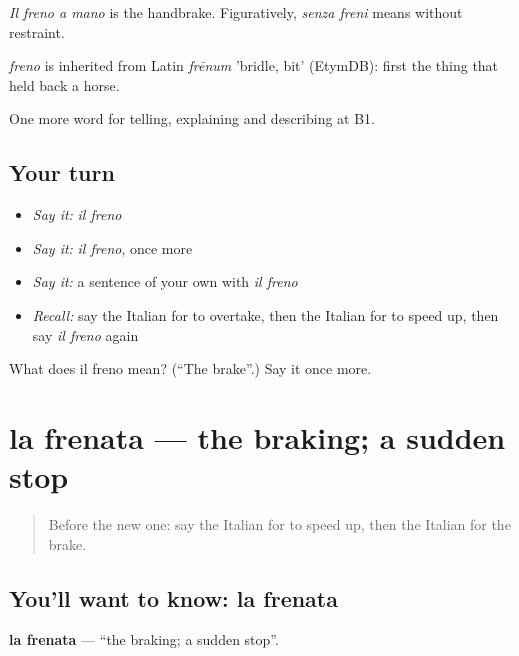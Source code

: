 \emph{Il freno a mano} is the handbrake. Figuratively, \emph{senza freni} means without restraint.

\begin{cousinweb}
\emph{freno} is inherited from Latin \emph{frēnum} 'bridle, bit' (EtymDB): first the thing that held back a horse.
\end{cousinweb}

\begin{grammarlens}[title={What you've built}]
One more word for telling, explaining and describing at B1.
\end{grammarlens}

\subsection*{Your turn}
\begin{itemize}
\raggedright
  \item \emph{Say it:} \emph{il freno}
  \item \emph{Say it:} \emph{il freno}, once more
  \item \emph{Say it:} a sentence of your own with \emph{il freno}
  \item \emph{Recall:} say the Italian for to overtake, then the Italian for to speed up, then say \emph{il freno} again
\end{itemize}

\begin{tcolorbox}[breakable,colback=teal!4,colframe=teal!35!black,title={Before you move on}]
What does il freno mean? (\textquotedblleft{}The brake\textquotedblright{}.) Say it once more.
\end{tcolorbox}
\section[la frenata]{la frenata — the braking; a sudden stop}

\label{lesson:IT-C406-frenata}



\begin{quote}
Before the new one: say the Italian for to speed up, then the Italian for the brake.
\end{quote}

\subsection*{You'll want to know: la frenata}
\textbf{la frenata} — \textquotedblleft{}the braking; a sudden stop\textquotedblright{}.

